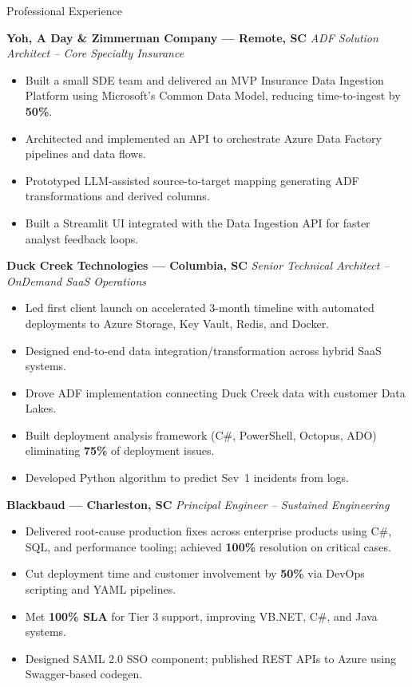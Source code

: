 \begin{rubric}{Professional Experience}

\entry*[2024--2025]
    \textbf{Yoh, A Day \& Zimmerman Company --- Remote, SC} \emph{ADF Solution Architect – Core Specialty Insurance} \begin{itemize}
        \item Built a small SDE team and delivered an MVP Insurance Data Ingestion Platform using Microsoft's Common Data Model, reducing time-to-ingest by \textbf{50\%}.
        
        \item Architected and implemented an API to orchestrate Azure Data Factory pipelines and data flows.
        
        \item Prototyped LLM-assisted source-to-target mapping generating ADF transformations and derived columns.
        
        \item Built a Streamlit UI integrated with the Data Ingestion API for faster analyst feedback loops.
    \end{itemize}

\entry*[2021--2023]
    \textbf{Duck Creek Technologies --- Columbia, SC} \emph{Senior Technical Architect – OnDemand SaaS Operations} \begin{itemize}
        \item Led first client launch on accelerated 3-month timeline with automated deployments to Azure Storage, Key Vault, Redis, and Docker.
        \item Designed end-to-end data integration/transformation across hybrid SaaS systems.
        \item Drove ADF implementation connecting Duck Creek data with customer Data Lakes.
        \item Built deployment analysis framework (C\#, PowerShell, Octopus, ADO) eliminating \textbf{75\%} of deployment issues.
        \item Developed Python algorithm to predict Sev~1 incidents from logs.
    \end{itemize}

    \entry*[2016--2020]
        \textbf{Blackbaud --- Charleston, SC} \emph{Principal Engineer – Sustained Engineering} \begin{itemize}
            \item Delivered root-cause production fixes across enterprise products using C\#, SQL, and performance tooling; achieved \textbf{100\%} resolution on critical cases.
            \item Cut deployment time and customer involvement by \textbf{50\%} via DevOps scripting and YAML pipelines.
            \item Met \textbf{100\% SLA} for Tier 3 support, improving VB.NET, C\#, and Java systems.
            \item Designed SAML 2.0 SSO component; published REST APIs to Azure using Swagger-based codegen.
        \end{itemize}
    

\end{rubric}
